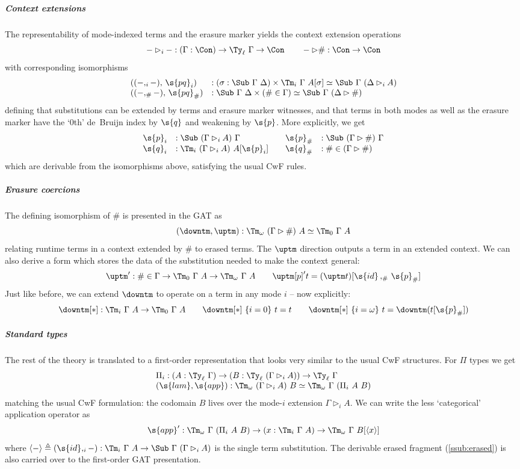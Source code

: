 \subparagraph{Context extensions}
The representability of mode-indexed terms and the erasure marker yields
the context extension operations
\[-\rhd_{i}- : (\Gamma : \Con) \to \Ty_\ell\ \Gamma \to \Con \qquad
-\rhd \# : \Con \to \Con\]
with corresponding isomorphisms
\[\begin{array}{ll}
((-,_i-),\, \s{pq}_i) &: (\sigma : \Sub\ \Gamma\ \Delta) \times \Tm_i\ \Gamma\ A[\sigma] \simeq \Sub\ \Gamma\ (\Delta \rhd_i A) \\
((-,_\#-),\, \s{pq}_\#) &: \Sub\ \Gamma\ \Delta \times (\# \in \Gamma) \simeq
\Sub\ \Gamma\ (\Delta \rhd \#) \end{array}\] defining that substitutions can be
extended by terms and erasure marker witnesses, and that terms in both modes as well
as the erasure marker have the `0th' de~Bruijn index by $\s{q}$ and weakening
by $\s{p}$. More explicitly, we get
\[\begin{array}{ll@{\qquad}ll}
\s{p}_i &: \Sub\ (\Gamma \rhd_i A)\ \Gamma &
\s{p}_\# &: \Sub\ (\Gamma \rhd \#)\ \Gamma \\
\s{q}_i &: \Tm_i\ (\Gamma \rhd_i A)\ A [\s{p}_i] &
\s{q}_\# &: \# \in (\Gamma \rhd \#)
\end{array}
\]
which are derivable from the isomorphisms above, satisfying the usual CwF rules.


\subparagraph{Erasure coercions}

The defining isomorphism of $\#$ is presented in the GAT as
\[(\downtm, \uptm) : \Tm_\omega\ (\Gamma \rhd \#)\ A \simeq \Tm_0\ \Gamma\ A\]
relating runtime terms in a context extended by $\#$ to erased terms. The
$\uptm$ direction outputs a term in an extended context. We can also derive
a form which stores the data of the substitution needed to make the context general:
\[{\uptm'} : \# \in \Gamma \to \Tm_0\ \Gamma\ A \to \Tm_\omega\ \Gamma\ A \qquad
{\uptm[p]'} t = (\uptm t)[\s{id} \, ,_\# \, \s{p}_\#]\]
Just like before, we can extend $\downtm$ to operate on a term in any mode $i$ -- now explicitly:
\[{\downtm[*]} : \Tm_i\ \Gamma\ A \to \Tm_0\ \Gamma\ A \qquad
{\downtm[*]}\ \{i=0\}\ t = t \qquad
{\downtm[*]}\ \{i=\omega\}\ t = {\downtm} (t[\s{p}_\#])\]


\subparagraph{Standard types}

The rest of the theory is translated to a first-order representation that looks
very similar to the usual CwF structures. For $\Pi$ types we get
\[\begin{array}{ll}
  \Pi_i : (A : \Ty_\ell\ \Gamma) \to (B : \Ty_\ell\ (\Gamma \rhd_i A)) \to \Ty_\ell\ \Gamma \\
  (\s{lam},\s{app}) : \Tm_\omega\ (\Gamma \rhd_i A)\ B
\simeq \Tm_\omega\ \Gamma\ (\Pi_i\ A\ B) \end{array}\]
matching the usual CwF formulation: the codomain $B$ lives over the
mode-$i$ extension $\Gamma \rhd_i A$. We can write the less `categorical'
application operator as
\[\s{app}' : \Tm_\omega\ \Gamma\ (\Pi_i\ A\ B) \to (x : \Tm_i\ \Gamma\ A) \to
\Tm_\omega\ \Gamma\ B[\langle x \rangle]\] where $\langle-\rangle
\triangleq (\s{id},_i -) : \Tm_i\ \Gamma\ A \to \Sub\ \Gamma\ (\Gamma \rhd_i A)$
is the single term substitution. The derivable erased fragment
(\cref{ssub:erased}) is also carried over to the first-order GAT presentation.


